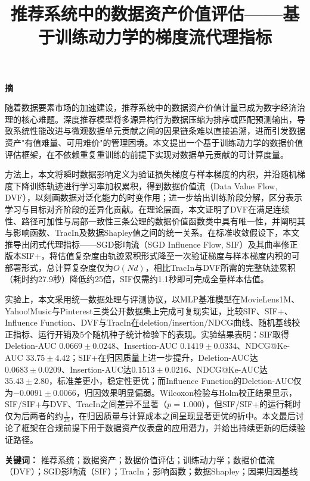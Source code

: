 \documentclass[12pt,a4paper]{ctexart}
\title{\textbf{推荐系统中的数据资产价值评估——基于训练动力学的梯度流代理指标}}
\theoremstyle{definition}
\theoremstyle{plain}
\renewenvironment{abstract}{
  \centerline{\textbf{摘\quad要}}\vspace{0.5em}\noindent
}{\par\vspace{1em}}
\newcommand{\keywords}[1]{\noindent\textbf{关键词：} #1} %
\begin{document}
\date{}
\maketitle

\begin{abstract}
随着数据要素市场的加速建设，推荐系统中的数据资产价值计量已成为数字经济治理的核心难题。深度推荐模型将多源异构行为数据压缩为排序或匹配预测输出，导致系统性能改进与微观数据单元贡献之间的因果链条难以直接追溯，进而引发数据资产"有值难量、可用难价"的管理困境。本文提出一个基于训练动力学的数据价值评估框架，在不依赖重复重训练的前提下实现对数据单元贡献的可计算度量。

方法上，本文将瞬时数据影响定义为验证损失梯度与样本梯度的内积，并沿随机梯度下降训练轨迹进行学习率加权累积，得到数据价值流（Data Value Flow, DVF），以刻画数据对泛化能力的时变作用；进一步给出训练阶段分解，区分表示学习与目标对齐阶段的差异化贡献。在理论层面，本文证明了DVF在满足连续性、路径可加性与局部一致性三条公理的数据价值函数类中具有唯一性，并阐明其与影响函数、TracIn及数据Shapley值之间的统一关系。在标准收敛假设下，本文推导出闭式代理指标——SGD影响流（SGD Influence Flow, SIF）及其曲率修正版本SIF+，将估值复杂度由轨迹累积形式降至一次验证梯度与样本梯度内积的可部署形式，总计算复杂度仅为$O(Nd)$，相比TracIn与DVF所需的完整轨迹累积（耗时约27.9秒）降低约25倍，SIF仅需约1.1秒即可完成全量样本估值。

实验上，本文采用统一数据处理与评测协议，以MLP基准模型在MovieLens1M、Yahoo!Music与Pinterest三类公开数据集上完成可复现实证，比较SIF、SIF+、Influence Function、DVF与TracIn在deletion/insertion/NDCG曲线、随机基线校正指标、运行开销及5个随机种子统计检验下的表现。实验结果表明：SIF取得Deletion-AUC $0.0669\pm0.0248$、Insertion-AUC $0.1419\pm0.0334$、NDCG@Ke-AUC $33.75\pm4.42$；SIF+在归因质量上进一步提升，Deletion-AUC达$0.0683\pm0.0209$、Insertion-AUC达$0.1513\pm0.0216$、NDCG@Ke-AUC达$35.43\pm2.80$，标准差更小，稳定性更优；而Influence Function的Deletion-AUC仅为$-0.0091\pm0.0066$，归因效果明显偏弱。Wilcoxon检验与Holm校正结果显示，SIF/SIF+与DVF、TracIn之间差异不显著（$p=1.000$），但SIF/SIF+的运行耗时仅为后两者的约$\frac{1}{25}$，在归因质量与计算成本之间呈现显著更优的折中。本文最后讨论了框架在合规前提下用于数据资产仪表盘的应用潜力，并给出持续更新的后续验证路径。
\end{abstract}


\keywords{推荐系统；数据资产；数据价值评估；训练动力学；数据价值流（DVF）；SGD影响流（SIF）；TracIn；影响函数；数据Shapley；因果归因基线}

\newpage
\tableofcontents
\newpage
\end{document}
